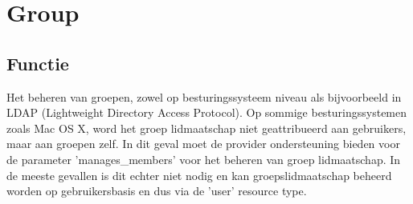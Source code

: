 \section{Group}

\subsection{Functie}
Het beheren van groepen, zowel op besturingssysteem niveau als bijvoorbeeld in LDAP (Lightweight Directory Access Protocol). Op sommige besturingssystemen zoals Mac OS X, word het groep lidmaatschap niet geattribueerd aan gebruikers, maar aan groepen zelf. In dit geval moet de provider ondersteuning bieden voor de parameter 'manages\_members' voor het beheren van groep lidmaatschap. In de meeste gevallen is dit echter niet nodig en kan groepslidmaatschap beheerd worden op gebruikersbasis en dus via de 'user' resource type.

